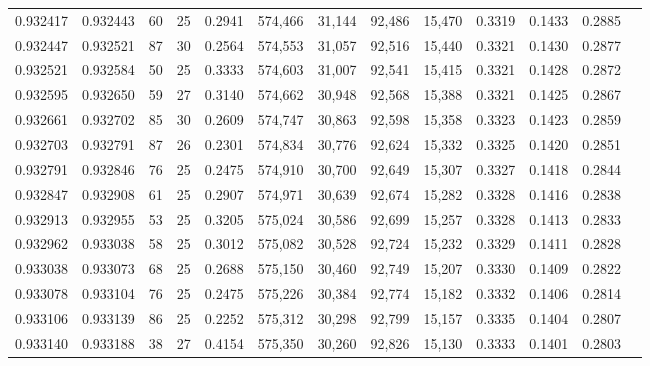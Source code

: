 \begin{tabular}{rrrrrrrrrrrrr}
0.932417 & 0.932443 &    60 &  25 &                                     0.2941 & 574,466 &  31,144 &  92,486 &  15,470 & 0.3319 & 0.1433 & 0.2885 \\
0.932447 & 0.932521 &    87 &  30 &                                     0.2564 & 574,553 &  31,057 &  92,516 &  15,440 & 0.3321 & 0.1430 & 0.2877 \\
0.932521 & 0.932584 &    50 &  25 &                                     0.3333 & 574,603 &  31,007 &  92,541 &  15,415 & 0.3321 & 0.1428 & 0.2872 \\
0.932595 & 0.932650 &    59 &  27 &                                     0.3140 & 574,662 &  30,948 &  92,568 &  15,388 & 0.3321 & 0.1425 & 0.2867 \\
0.932661 & 0.932702 &    85 &  30 &                                     0.2609 & 574,747 &  30,863 &  92,598 &  15,358 & 0.3323 & 0.1423 & 0.2859 \\
0.932703 & 0.932791 &    87 &  26 &                                     0.2301 & 574,834 &  30,776 &  92,624 &  15,332 & 0.3325 & 0.1420 & 0.2851 \\
0.932791 & 0.932846 &    76 &  25 &                                     0.2475 & 574,910 &  30,700 &  92,649 &  15,307 & 0.3327 & 0.1418 & 0.2844 \\
0.932847 & 0.932908 &    61 &  25 &                                     0.2907 & 574,971 &  30,639 &  92,674 &  15,282 & 0.3328 & 0.1416 & 0.2838 \\
0.932913 & 0.932955 &    53 &  25 &                                     0.3205 & 575,024 &  30,586 &  92,699 &  15,257 & 0.3328 & 0.1413 & 0.2833 \\
0.932962 & 0.933038 &    58 &  25 &                                     0.3012 & 575,082 &  30,528 &  92,724 &  15,232 & 0.3329 & 0.1411 & 0.2828 \\
0.933038 & 0.933073 &    68 &  25 &                                     0.2688 & 575,150 &  30,460 &  92,749 &  15,207 & 0.3330 & 0.1409 & 0.2822 \\
0.933078 & 0.933104 &    76 &  25 &                                     0.2475 & 575,226 &  30,384 &  92,774 &  15,182 & 0.3332 & 0.1406 & 0.2814 \\
0.933106 & 0.933139 &    86 &  25 &                                     0.2252 & 575,312 &  30,298 &  92,799 &  15,157 & 0.3335 & 0.1404 & 0.2807 \\
0.933140 & 0.933188 &    38 &  27 &                                     0.4154 & 575,350 &  30,260 &  92,826 &  15,130 & 0.3333 & 0.1401 & 0.2803 \\

\end{tabular}
